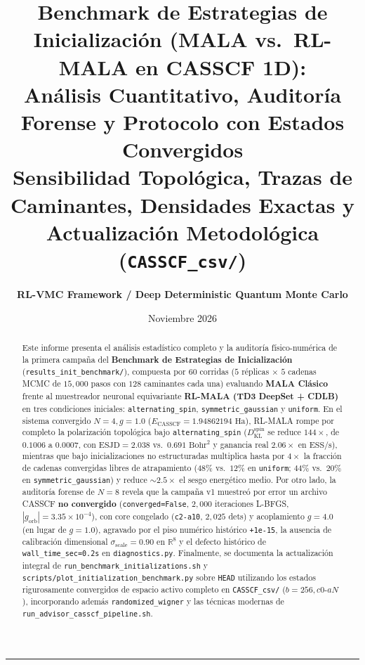 \documentclass[10pt,a4paper]{article}
\title{\textbf{\Large Benchmark de Estrategias de Inicializaci\'on (MALA vs.\ RL-MALA en CASSCF 1D):\\
An\'alisis Cuantitativo, Auditor\'ia Forense y Protocolo con Estados Convergidos}\\
\vspace{0.2cm}
\large Sensibilidad Topol\'ogica, Trazas de Caminantes, Densidades Exactas y Actualizaci\'on Metodol\'ogica (\texttt{CASSCF\_csv/})}
\author{\textbf{RL-VMC Framework / Deep Deterministic Quantum Monte Carlo}}
\date{Noviembre 2026}
\begin{document}
\maketitle

\begin{abstract}
Este informe presenta el an\'alisis estad\'istico completo y la auditor\'ia f\'isico-num\'erica de la primera campa\~na del \textbf{Benchmark de Estrategias de Inicializaci\'on} (\texttt{results\_init\_benchmark/}), compuesta por $60$ corridas ($5$ r\'eplicas $\times$ $5$ cadenas MCMC de $15{,}000$ pasos con $128$ caminantes cada una) evaluando \textbf{MALA Cl\'asico} frente al muestreador neuronal equivariante \textbf{RL-MALA (TD3 DeepSet + CDLB)} en tres condiciones iniciales: \texttt{alternating\_spin}, \texttt{symmetric\_gaussian} y \texttt{uniform}. En el sistema convergido $N=4, g=1.0$ ($E_{\mathrm{CASSCF}} = 1.94862194\text{ Ha}$), RL-MALA rompe por completo la polarizaci\'on topol\'ogica bajo \texttt{alternating\_spin} ($D_{\mathrm{KL}}^{\mathrm{spin}}$ se reduce $144\times$, de $0.1006$ a $0.0007$, con $\mathrm{ESJD}=2.038$ vs.\ $0.691\text{ Bohr}^2$ y ganancia real $2.06\times$ en $\mathrm{ESS/s}$), mientras que bajo inicializaciones no estructuradas multiplica hasta por $4\times$ la fracci\'on de cadenas convergidas libres de atrapamiento ($48\%$ vs.\ $12\%$ en \texttt{uniform}; $44\%$ vs.\ $20\%$ en \texttt{symmetric\_gaussian}) y reduce $\sim 2.5\times$ el sesgo energ\'etico medio. Por otro lado, la auditor\'ia forense de $N=8$ revela que la campa\~na v1 muestre\'o por error un archivo CASSCF \textbf{no convergido} (\texttt{converged=False}, $2{,}000$ iteraciones L-BFGS, $|g_{\mathrm{orb}}|=3.35\times 10^{-4}$), con core congelado (\texttt{c2-a10}, $2{,}025$ dets) y acoplamiento $g=4.0$ (en lugar de $g=1.0$), agravado por el piso num\'erico hist\'orico \texttt{+1e-15}, la ausencia de calibraci\'on dimensional $\sigma_{\mathrm{scale}}=0.90$ en $\mathbb{R}^8$ y el defecto hist\'orico de \texttt{wall\_time\_sec=0.2s} en \texttt{diagnostics.py}. Finalmente, se documenta la actualizaci\'on integral de \texttt{run\_benchmark\_initializations.sh} y \texttt{scripts/plot\_initialization\_benchmark.py} sobre \texttt{HEAD} utilizando los estados rigurosamente convergidos de espacio activo completo en \texttt{CASSCF\_csv/} ($b=256, c0\text{-}aN$), incorporando adem\'as \texttt{randomized\_wigner} y las t\'ecnicas modernas de \texttt{run\_advisor\_casscf\_pipeline.sh}.
\end{abstract}

\tableofcontents
\vspace{0.4cm}
\hrule
\vspace{0.4cm}
\end{document}
